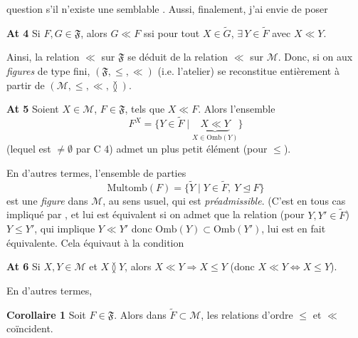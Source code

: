 \documentclass[11pt,a4paper]{article}
\begin{document}

question s'il n'existe une semblable . Aussi, finalement, j'ai envie de poser

\textbf{At 4} Si $F, G \in \mathfrak{F}$, alors $G \ll F$ ssi pour tout $X \in \widetilde{G}$, $\exists\, Y \in \widetilde{F}$ avec $X \ll Y$.

Ainsi, la relation $\ll$ sur $\mathfrak{F}$ se déduit de la relation $\ll$ sur $\mathcal{M}$. Donc, si on \ill{} aux \emph{figures} de type fini, $(\mathfrak{F}, \leq, \ll)$ (i.e. \ill{} l'atelier) se reconstitue entièrement à partir de $(\mathcal{M}, \leq, \ll, \between)$.


\textbf{At 5} Soient $X \in \mathcal{M}$, $F \in \mathfrak{F}$, tels que $X \ll F$. Alors  l'ensemble
\[
  F^{X} = \lbrace Y \in \widetilde{F} \mid \underbrace{X \ll Y}_{X \in \mathrm{Omb}(Y)} \rbrace
\]
(lequel est $\neq \emptyset$ par C 4) admet un plus petit élément (pour $\leq$).

En d'autres termes, l'ensemble de parties
\[
  \mathrm{Multomb}(F) = \lbrace \widetilde{Y} \mid Y \in \widetilde{F}, \ Y \trianglelefteq F \rbrace
\]
est une \emph{figure} dans $\mathcal{M}$, \struck{\ill{}} au sens usuel,  qui est \emph{préadmissible}. (C'est \ill{} en tous cas impliqué par , et lui est équivalent si on admet que la relation (pour $Y, Y' \in \widetilde{F}$) $Y \leq Y'$, qui implique $Y \ll Y'$ donc $\mathrm{Omb}(Y) \subset \mathrm{Omb}(Y')$, lui est en fait équivalente. Cela équivaut à la condition

\textbf{At 6} Si $X, Y \in \mathcal{M}$ et $X \between Y$, alors $X \ll Y \Rightarrow X \leq Y$ (donc $X \ll Y \Leftrightarrow X \leq Y$).

En d'autres termes,

\textbf{Corollaire 1} Soit $F \in \mathfrak{F}$. Alors dans $\widetilde{F} \subset \mathcal{M}$, les relations d'ordre $\leq$ et $\ll$ coïncident.
\end{document}
